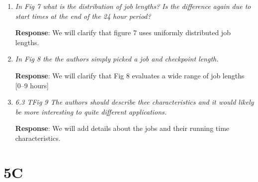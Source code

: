 \documentclass{article}
\newcommand{\resp}[1]{\textbf{Response}: #1}
\begin{document}
\begin{enumerate}
\resp{Even basic heuristics would need to be based on sound principled empirical models, which we provide. We will discuss this in Section 8.}

\item \emph{In Fig 7 what is the distribution of job lengths? Is the difference again due to start times at the end of the 24 hour period?}

\resp{We will clarify that figure 7 uses uniformly distributed job lengths.}


\item \emph{In Fig 8 the the authors simply picked a job and checkpoint length.}

\resp{We will clarify that Fig 8 evaluates a wide range of job lengths [0--9 hours]}


\item \emph{6.3 TFig 9 The authors should describe thee characteristics and it would likely be more interesting to quite different applications.}

\resp{We will add details about the jobs and their running time characteristics.}


\end{enumerate}

\section{5C}
\end{document}

